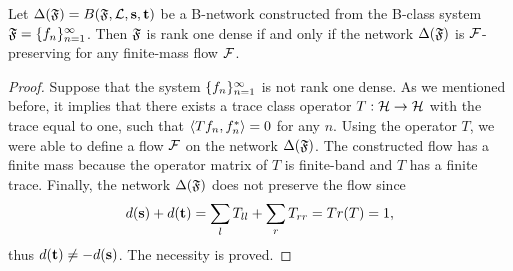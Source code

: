 \documentclass[12pt,oneside,a4paper]{amsart}
\begin{document}
      \begin{theorem}
        \label{thm-graph-eq}
          Let $\net(\fsys) = B(\fsys, \len, \source, \sink)$ be a B-network constructed
            from the B-class system $\fsys = \seq{f}$.
          Then $\fsys$ is rank one dense if and only if
            the network $\net(\fsys)$ is $\flow$-preserving for any finite-mass flow $\flow$.
      \end{theorem}
      \begin{proof}
        Suppose that the system $\seq{f}$ is not rank one dense.
        As we mentioned before, it implies that there exists a trace class operator $T: \cal{H} \to \cal{H}$ with
          the trace equal to one, such that $\inner{Tf_n}{f_n^*} = 0$ for any $n$.
        Using the operator $T$, we were able to define a flow $\flow$ on the network $\net(\fsys)$.
        The constructed flow has a finite mass because the operator matrix of $T$ is finite-band and $T$ has a finite trace.
        Finally, the network $\net(\fsys)$ does not preserve the flow since
        \[
          d(\source) + d(\sink) = \sum_{l} T_{ll} + \sum_{r} T_{rr} = Tr(T) = 1,
        \]
        thus $d(\sink) \neq -d(\source)$.
        The necessity is proved.


\end{proof}
\end{document}
